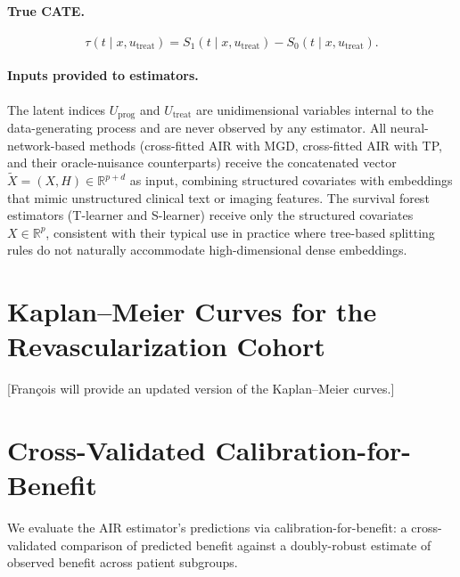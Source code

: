 \documentclass{article}
\newcommand{\R}{\mathbb{R}}
\begin{document}
\paragraph{True CATE.}
\[
  \tau(t \mid x, u_{\mathrm{treat}})
  = S_1(t \mid x, u_{\mathrm{treat}}) - S_0(t \mid x, u_{\mathrm{treat}}).
\]

\paragraph{Inputs provided to estimators.}
The latent indices $U_{\mathrm{prog}}$ and $U_{\mathrm{treat}}$ are unidimensional variables internal to the data-generating process and are never observed by any estimator.
All neural-network-based methods (cross-fitted AIR with MGD, cross-fitted AIR with TP, and their oracle-nuisance counterparts) receive the concatenated vector $\tilde X = (X, H) \in \R^{p+d}$ as input, combining structured covariates with embeddings that mimic unstructured clinical text or imaging features.
The survival forest estimators (T-learner and S-learner) receive only the structured covariates~$X \in \R^p$, consistent with their typical use in practice where tree-based splitting rules do not naturally accommodate high-dimensional dense embeddings.

\section{Kaplan--Meier Curves for the Revascularization Cohort}\label{appendix:km}

{\color{blue} [François will provide an updated version of the Kaplan--Meier curves.]}


\section{Cross-Validated Calibration-for-Benefit}\label{appendix:calibration}

We evaluate the AIR estimator's predictions via calibration-for-benefit: a cross-validated comparison of predicted benefit against a doubly-robust estimate of observed benefit across patient subgroups.
\end{document}
